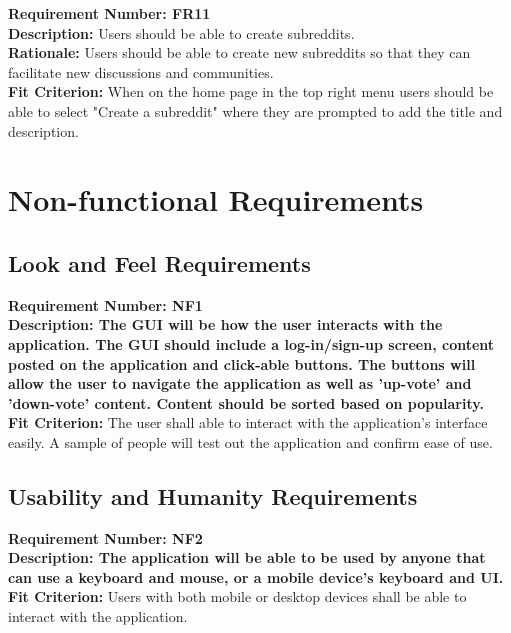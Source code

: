\documentclass[12pt,fleqn]{article}
\begin{document}
\begin{tcolorbox}
\textbf{Requirement Number: FR11} \\
\textbf{Description:} Users should be able to create subreddits.\\
\textbf{Rationale:} Users should be able to create new subreddits so that they can facilitate new discussions and communities.\\
\textbf{Fit Criterion:} When on the home page in the top right menu users should be able to select "Create a subreddit" where they are prompted to add the title and description.
\end{tcolorbox}

\pagebreak
\section {Non-functional Requirements}

\subsection {Look and Feel Requirements}
\begin{tcolorbox}
\textbf{Requirement Number: NF1} \\
\textbf{Description:
 The GUI will be how the user interacts with the application.  The GUI should include a log-in/sign-up screen, content posted on the application and click-able buttons.  The buttons will allow the user to navigate the application as well as 'up-vote' and 'down-vote' content.  Content should be sorted based on popularity.  }  \\
{\color{red}\textbf{Fit Criterion:} The user shall able to interact with the application's interface easily.  A sample of people will test out the application and confirm ease of use.}
\end{tcolorbox}

\subsection {Usability and Humanity Requirements}
\begin{tcolorbox}
\textbf{Requirement Number: NF2} \\
\textbf{Description:
The application will be able to be used by anyone that can use a keyboard and mouse, or a mobile device's keyboard and UI.} \\
{\color{red} \textbf{Fit Criterion:} Users with both mobile or desktop devices shall be able to interact with the application.}
\end{tcolorbox}
\end{document}
